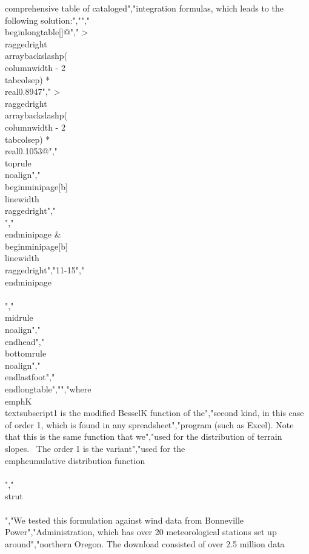 {{{{{{{comprehensive table of cataloged","integration formulas, which leads to the following solution:","","\\begin{longtable}[]{@{}","  >{\\raggedright\\arraybackslash}p{(\\columnwidth - 2\\tabcolsep) * \\real{0.8947}}","  >{\\raggedright\\arraybackslash}p{(\\columnwidth - 2\\tabcolsep) * \\real{0.1053}}@{}}","\\toprule\\noalign{}","\\begin{minipage}[b]{\\linewidth}\\raggedright","\\[P(E) = 2\\ \\sqrt{\\frac{E}{\\overline{E}}}\\ K_{1}\\left( 2\\ \\sqrt{\\frac{E}{\\overline{E}}} \\right)\\]","\\end{minipage} & \\begin{minipage}[b]{\\linewidth}\\raggedright","11-15","\\end{minipage} \\\\","\\midrule\\noalign{}","\\endhead","\\bottomrule\\noalign{}","\\endlastfoot","\\end{longtable}","","where \\emph{K\\textsubscript{1}} is the modified BesselK function of the","second kind, in this case of order 1, which is found in any spreadsheet","program (such as Excel). Note that this is the same function that we","used for the distribution of terrain slopes.~ The order 1 is the variant","used for the \\emph{cumulative} distribution function\\\\","\\strut \\\\","We tested this formulation against wind data from Bonneville Power","Administration, which has over 20 meteorological stations set up around","northern Oregon. The download consisted of over 2.5 million data }}}}}}}
